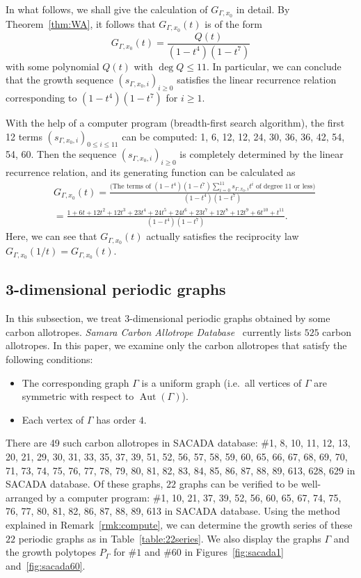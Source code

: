 \documentclass[ALCO,published]{cedram}
\theoremstyle{remark}
\begin{document}
In what follows, we shall give the calculation of $G_{\Gamma, x_0}$ in detail. 
By Theorem~\ref{thm:WA}, it follows that $G_{\Gamma, x_0}(t)$ is of the form 
\[
G_{\Gamma, x_0}(t) = \frac{Q(t)}{(1-t^4)(1-t^7)}
\]
with some polynomial $Q(t)$ with $\deg Q \le 11$. 
In particular, we can conclude that the growth sequence $(s_{\Gamma, x_0, i})_{i \ge 0}$ satisfies the linear recurrence relation corresponding to $(1-t^4)(1-t^7)$ for $i \ge 1$. 

With the help of a computer program (breadth-first search algorithm), the first 12 terms $(s_{\Gamma, x_0, i})_{0 \le i \le 11}$ can be computed: 
1, 6, 12, 12, 24, 30, 36, 36, 42, 54, 54, 60. 
Then the sequence $(s_{\Gamma, x_0, i})_{i \ge 0}$ is completely determined by the linear recurrence relation, and its generating function can be calculated as
\begin{align*}
&G_{\Gamma, x_0}(t) 
= 
\frac{\bigl(\text{The terms of $(1-t^4)(1-t^7)\sum_{i=0}^{11}s_{\Gamma, x_0, i}t^i$ of degree $11$ or less}\bigr)}{(1-t^4)(1-t^7)}\\
&=
\frac{1+6 t+12 t^{2}+12 t^{3}+23 t^{4}+24 t^{5}+24 t^{6}+23 t^{7}+12 t^{8}+12 t^{9}+6 t^{10}+t^{11}}{(1-t^4)(1-t^7)}. 
\end{align*}
Here, we can see that $G_{\Gamma, x_0}(t)$ actually satisfies the reciprocity law $G_{\Gamma, x_0}(1/t) = G_{\Gamma, x_0}(t)$. 


\subsection{3-dimensional periodic graphs}\label{subsection:eg_3dim}
In this subsection, we treat $3$-dimensional periodic graphs obtained by some carbon allotropes. 
\textit{Samara Carbon Allotrope Database}~\cite{SACADA} currently lists $525$ carbon allotropes. 
In this paper, we examine only the carbon allotropes that satisfy the following conditions:
\begin{itemize}
\item The corresponding graph $\Gamma$ is a uniform graph (i.e.\ all vertices of $\Gamma$ are symmetric with respect to $\operatorname{Aut}(\Gamma)$). 

\item Each vertex of $\Gamma$ has order $4$.  
\end{itemize}
There are 49 such carbon allotropes in {\sf SACADA} database: 
$\#$1, 8, 10, 11, 12, 13, 20, 21, 29, 30, 31, 33, 35, 37, 39, 51, 52, 56, 57, 58, 59, 60, 65, 66, 67, 68, 69, 70, 71, 73, 74, 75, 76, 77, 78, 79, 80, 81, 82, 83, 84, 85, 86, 87, 88, 89, 613, 628, 629 in {\sf SACADA} database.
Of these graphs, $22$ graphs can be verified to be well-arranged by a computer program: 
$\#$1, 10, 21, 37, 39, 52, 56, 60, 65, 67, 74, 75, 76, 77, 80, 81, 82, 86, 87, 88, 89, 613 in {\sf SACADA} database. 
Using the method explained in Remark~\ref{rmk:compute}, we can determine the growth series of these $22$ periodic graphs as in Table~\ref{table:22series}. 
We also display the graphs $\Gamma$ and the growth polytopes $P_{\Gamma}$ for $\#1$ and $\#60$ in Figures~\ref{fig:sacada1} and~\ref{fig:sacada60}.
\end{document}
